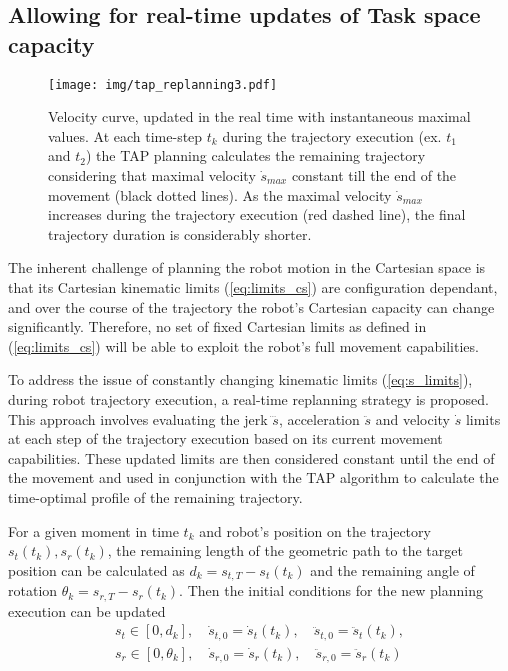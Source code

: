\subsection{Allowing for real-time updates of Task space capacity}
\label{ch:update_cap}


\begin{figure}[t]
    \centering
    \texttt{[image: img/tap\_replanning3.pdf]}
    \caption{Velocity curve, updated in the real time with instantaneous maximal values. At each time-step $t_k$ during the trajectory execution (ex. $t_1$ and $t_2$) the TAP planning calculates the remaining trajectory considering that maximal velocity $\dot{s}_{max}$ constant till the end of the movement (black dotted lines). As the maximal velocity $\dot{s}_{max}$ increases during the trajectory execution (red dashed line), the final trajectory duration is considerably shorter. }
    \label{fig:replanning}
\end{figure}

The inherent challenge of planning the robot motion in the Cartesian space is that its Cartesian kinematic limits (\ref{eq:limits_cs}) are configuration dependant, and over the course of the trajectory the robot's Cartesian capacity can change significantly. Therefore, no set of fixed Cartesian limits as defined in (\ref{eq:limits_cs}) will be able to exploit the robot's full movement capabilities.  

To address the issue of constantly changing kinematic limits (\ref{eq:s_limits}), during robot trajectory execution, a real-time replanning strategy is proposed. This approach involves evaluating the jerk $\dddot{s}$, acceleration $\ddot{s}$ and velocity $\dot{s}$ limits at each step of the trajectory execution based on its current movement capabilities. These updated limits are then considered constant until the end of the movement and used in conjunction with the TAP algorithm to calculate the time-optimal profile of the remaining trajectory.  

For a given moment in time $t_k$ and robot's position on the trajectory $s_t(t_k),s_r(t_k)$, the remaining length of the 
geometric path to the target position can be calculated as $d_k = s_{t,T} - s_t(t_k)$ and the remaining angle of rotation $\theta_k\!=\!s_{r,T}\! - \!s_r(t_k)$. Then the initial conditions for the new planning execution can be updated 
\begin{equation}
\begin{split}
    s_t \in [0, d_k], \quad \dot{s}_{t,0} = \dot{s}_t(t_k), \quad \ddot{s}_{t,0} = \ddot{s}_t(t_k),\\ 
    s_r \in [0 , \theta_k], \quad \dot{s}_{r,0} = \dot{s}_r(t_k), \quad \ddot{s}_{r,0} = \ddot{s}_r(t_k)
\end{split}\label{eq:rt_init}
\end{equation}

